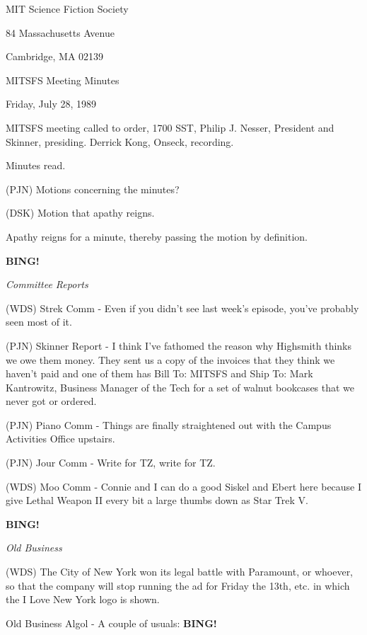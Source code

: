 \documentclass[12pt]{article}
\newcommand{\bing}{{\bf BING!} }
\newcommand{\goto}[1]{\bing \vskip 12pt \centerline{{\em{#1}}}}
\begin{document}
\begin{center}

MIT Science Fiction Society 

84 Massachusetts Avenue

Cambridge, MA 02139

\vspace{12pt}

MITSFS Meeting Minutes 

Friday, July 28, 1989

\end{center}
 
\vspace{18pt}

\setlength{\parskip}{6pt}

\noindent
MITSFS meeting called to order, 1700 SST, Philip J. Nesser, President and Skinner, presiding. Derrick Kong, Onseck, recording.

Minutes read.

(PJN) Motions concerning the minutes?

(DSK) Motion that apathy reigns.

Apathy reigns for a minute, thereby passing the motion by definition.

\goto{Committee Reports}

(WDS) Strek Comm - Even if you didn't see last week's episode, you've probably seen most of it.

(PJN) Skinner Report - I think I've fathomed the reason why Highsmith thinks we owe them money.  They sent us a copy of the invoices that they think we haven't paid and one of them has Bill To: MITSFS and Ship To: Mark Kantrowitz, Business Manager of the Tech for a set of walnut bookcases that we never got or ordered.

(PJN) Piano Comm - Things are finally straightened out with the Campus Activities Office upstairs.

(PJN) Jour Comm - Write for TZ, write for TZ.

(WDS) Moo Comm - Connie and I can do a good Siskel and Ebert here because I give Lethal Weapon II every bit a large thumbs down as Star Trek V.

\goto{Old Business}

(WDS) The City of New York won its legal battle with Paramount, or whoever, so that the company will stop running the ad for Friday the 13th, etc. in which the I Love New York logo is shown.

Old Business Algol - A couple of usuals: \bing
\end{document}
